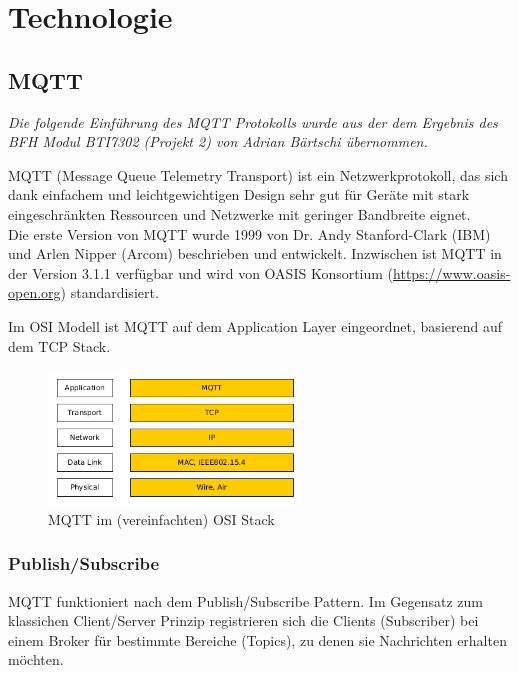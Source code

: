\chapter{Technologie}
\label{chap:technologie}

\section{MQTT}

\textit{Die folgende Einführung des MQTT Protokolls wurde aus der dem Ergebnis des BFH Modul BTI7302 (Projekt 2) von Adrian Bärtschi übernommen.}

MQTT (Message Queue Telemetry Transport) ist ein Netzwerkprotokoll, das sich dank einfachem und leichtgewichtigen Design sehr gut für Geräte mit stark eingeschränkten Ressourcen und Netzwerke mit geringer Bandbreite eignet. 
\\
Die erste Version von MQTT wurde 1999 von Dr. Andy Stanford-Clark (IBM) und Arlen Nipper (Arcom) beschrieben und entwickelt. Inzwischen ist MQTT in der Version 3.1.1 verfügbar  \cite{mqttSpez} und wird von OASIS Konsortium (\url{https://www.oasis-open.org}) standardisiert.

Im OSI Modell ist MQTT auf dem Application Layer eingeordnet, basierend auf dem TCP Stack.

\begin{figure}[H]
	\centering
		\includegraphics[width=0.6\textwidth]{diag/osi_mqtt.png}
	\caption{\label{fig:mqttosi}MQTT im (vereinfachten) OSI Stack}
\end{figure}

\subsection{Publish/Subscribe}
MQTT funktioniert nach dem Publish/Subscribe Pattern. Im Gegensatz zum klassichen Client/Server Prinzip registrieren sich die Clients (Subscriber) bei einem Broker für bestimmte Bereiche (Topics), zu denen sie Nachrichten erhalten möchten.
\\ \\

